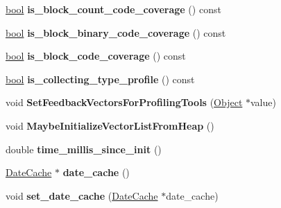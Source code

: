 \begin{DoxyCompactItemize}
\mbox{\hyperlink{classbool}{bool}} {\bfseries is\+\_\+block\+\_\+count\+\_\+code\+\_\+coverage} () const
\item 
\mbox{\label{classv8_1_1internal_1_1Isolate_aba8b45b64901cfb48e73159e33b72427}} 
\mbox{\hyperlink{classbool}{bool}} {\bfseries is\+\_\+block\+\_\+binary\+\_\+code\+\_\+coverage} () const
\item 
\mbox{\label{classv8_1_1internal_1_1Isolate_ad8c393a87ff842b46f6b40d0a4706557}} 
\mbox{\hyperlink{classbool}{bool}} {\bfseries is\+\_\+block\+\_\+code\+\_\+coverage} () const
\item 
\mbox{\label{classv8_1_1internal_1_1Isolate_ac21b392cd326fcc54f6190dbc112d851}} 
\mbox{\hyperlink{classbool}{bool}} {\bfseries is\+\_\+collecting\+\_\+type\+\_\+profile} () const
\item 
\mbox{\label{classv8_1_1internal_1_1Isolate_a68dbdcb0e1fbc04238c50014582c35fe}} 
void {\bfseries Set\+Feedback\+Vectors\+For\+Profiling\+Tools} (\mbox{\hyperlink{classv8_1_1internal_1_1Object}{Object}} $\ast$value)
\item 
\mbox{\label{classv8_1_1internal_1_1Isolate_a8a77192021457588c7627b4d7f3f9a08}} 
void {\bfseries Maybe\+Initialize\+Vector\+List\+From\+Heap} ()
\item 
\mbox{\label{classv8_1_1internal_1_1Isolate_a03d73dfe207ff9134265d619016fb29c}} 
double {\bfseries time\+\_\+millis\+\_\+since\+\_\+init} ()
\item 
\mbox{\label{classv8_1_1internal_1_1Isolate_a6c63d2b49f865326524ade383cb9f3c7}} 
\mbox{\hyperlink{classv8_1_1internal_1_1DateCache}{Date\+Cache}} $\ast$ {\bfseries date\+\_\+cache} ()
\item 
\mbox{\label{classv8_1_1internal_1_1Isolate_a5aec58506808233f8f65f93d2959c5c6}} 
void {\bfseries set\+\_\+date\+\_\+cache} (\mbox{\hyperlink{classv8_1_1internal_1_1DateCache}{Date\+Cache}} $\ast$date\+\_\+cache)
\item 
\mbox{\label{classv8_1_1internal_1_1Isolate_a4489519d91fe475d2c77e82938a85df7}} 

\end{DoxyCompactItemize}
